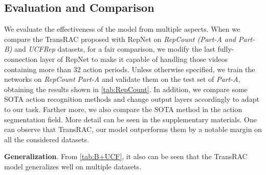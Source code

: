 \documentclass[10pt,twocolumn,letterpaper]{article}
\begin{document}
\subsection{Evaluation and Comparison}
We evaluate the effectiveness of the model from multiple aspects. When we compare the TransRAC proposed with RepNet on \emph{RepCount (Part-A and Part-B)} and \emph{UCFRep} datasets, for a fair comparison, we modify the last fully-connection layer of RepNet\cite{RepNet} to make it capable of handling those videos containing more than 32 action periods. Unless otherwise specified, we train the networks on \emph{RepCount Part-A} and validate them on the test set of \emph{Part-A}, obtaining the results shown in \cref{tab:RepCount}. In addition, we compare some SOTA action recognition methods \cite{X3D,TANet,video-swin-transformer} and change output layers accordingly to adapt to our task. 
Farther more, we also compare the SOTA method \cite{huang2020improving} in the action segmentation field. More detail can be seen in the supplementary materials. One can observe that TransRAC, our model outperforms them by a notable margin on all the considered datasets.

\noindent \textbf{Generalization}.
From \cref{tab:B+UCF}, it also can be seen that the TransRAC model generalizes well on multiple datasets. 

\begin{table}[ht]
	\centering

	\caption{
		Performance of different method on \emph{RepCount part-A test} when trained on the same train set of \emph{RepCount}.
	}
	\label{tab:RepCount}
\end{table}
\end{document}
